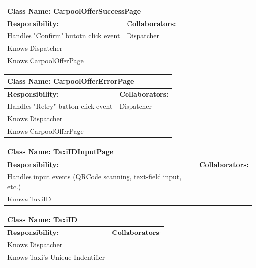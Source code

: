 \documentclass[]{article}
\begin{document}
	\begin{table}[H]
	\centering
	\begin{tabular}{|p{6cm}|p{6cm}|}
	\hline 
		\multicolumn{2}{|l|}{\textbf{Class Name: CarpoolOfferSuccessPage}} \\
	\hline
	\textbf{Responsibility:} & \textbf{Collaborators:} \\
	\hline
	Handles "Confirm" butotn click event  & Dispatcher\\ \hline 
	Knows Dispatcher &\\ \hline
	Knows CarpoolOfferPage &\\ \hline
	\end{tabular}
	\end{table}

	\begin{table}[H]
	\centering
	\begin{tabular}{|p{6cm}|p{6cm}|}
	\hline 
		\multicolumn{2}{|l|}{\textbf{Class Name: CarpoolOfferErrorPage}} \\
	\hline
	\textbf{Responsibility:} & \textbf{Collaborators:} \\
	\hline
	Handles "Retry" button click event  & Dispatcher\\ \hline 
	Knows Dispatcher &\\ \hline
	Knows CarpoolOfferPage &\\ \hline
	\end{tabular}
	\end{table}

	\begin{table}[H]
	\centering
	\begin{tabular}{|p{6cm}|p{6cm}|}
	\hline 
		\multicolumn{2}{|l|}{\textbf{Class Name: TaxiIDInputPage}} \\
	\hline
	\textbf{Responsibility:} & \textbf{Collaborators:} \\
	\hline
	Handles input events (QRCode scanning, text-field input, etc.) &\\ \hline
	Knows TaxiID&  \\ \hline
	\end{tabular}
	\end{table}

	\begin{table}[H]
	\centering
	\begin{tabular}{|p{6cm}|p{6cm}|}
	\hline 
		\multicolumn{2}{|l|}{\textbf{Class Name: TaxiID}} \\
	\hline
	\textbf{Responsibility:} & \textbf{Collaborators:} \\
	\hline
	Knows Dispatcher&  \\ \hline
	Knows Taxi's Unique Indentifier&  \\ \hline
	\end{tabular}
	\end{table}
\end{document}

